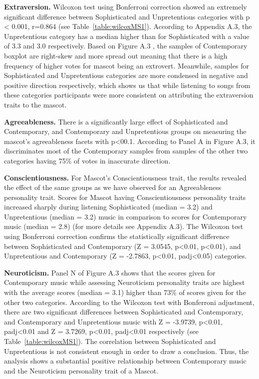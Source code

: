 \par \textbf{Extraversion.} Wilcoxon test using Bonferroni correction showed an extremely significant difference between Sophisticated and Unpretentious categories with p < 0.001, r=0.864 (see Table~\ref{table:wilcoxMS1}). According to Appendix A.3, the Unpretentious category has a median higher than for Sophisticated with a value of 3.3 and 3.0 respectively. 
Based on Figure A.3 , the samples of Contemporary boxplot are right-skew and more spread out meaning that there is a high frequency of higher votes for mascot being an extrovert. Meanwhile, samples for Sophisticated and Unpretentious categories are more condensed in negative and positive direction respectively, which shows us that while listening to songs from these categories participants were more consistent on attributing the extraversion traits to the mascot. 
\par \textbf{Agreeableness.} There is a significantly large effect of Sophisticated and Contemporary, and Contemporary and Unpretentious groups on measuring the mascot’s agreeableness facets with p<00.1. According to Panel A in Figure A.3, it discriminates most of the Contemporary samples from samples of the other two categories having 75\% of votes in inaccurate direction. 
\par \textbf{Conscientiousness.} For Mascot’s Conscientiousness trait, the results revealed the effect of the same groups as we have observed for an Agreeableness personality trait. Scores for Mascot having Conscientiousness personality traits increased sharply during listening Sophisticated (median = 3.2) and Unpretentious (median = 3.2) music in comparison to scores for Contemporary music (median = 2.8) (for more details see Appendix A.3). The Wilcoxon test using Bonferroni correction confirms the statistically significant difference between Sophisticated and Contemporary (Z = 3.0545, p<0.01, p<0.01), and Unpretentious and Contemporary (Z = -2.7863, p<0.01, padj<0.05) categories.
\par \textbf{Neuroticism.} Panel N of Figure A.3 shows that the scores given for Contemporary music while assessing Neuroticism personality traits are highest with the average scores (median = 3.1) higher than 73\% of scores given for the other two categories. According to the Wilcoxon test with Bonferroni adjustment, there are two significant differences between Sophisticated and Contemporary, and Contemporary and Unpretentious music with  Z = -3.9739, p<0.01, padj<0.01 and Z = 3.7269, p<0.01, padj<0.01 respectively (see Table~\ref{table:wilcoxMS1}). The correlation between Sophisticated and Unpretentious is not consistent enough in order to draw a conclusion. Thus, the analysis shows a substantial positive relationship between Contemporary music and the Neuroticism personality trait of a Mascot.
